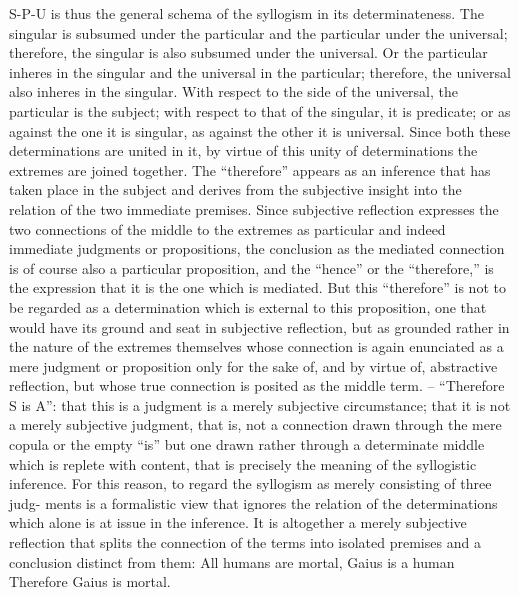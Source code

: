 S-P-U is thus the general schema of the syllogism in its determinateness.
The singular is subsumed under the particular and the particular under the
universal; therefore, the singular is also subsumed under the universal. Or
the particular inheres in the singular and the universal in the particular;
therefore, the universal also inheres in the singular. With respect to the side
of the universal, the particular is the subject; with respect to that of the
singular, it is predicate; or as against the one it is singular, as against the
other it is universal. Since both these determinations are united in it, by
virtue of this unity of determinations the extremes are joined together. The
“therefore” appears as an inference that has taken place in the subject and
derives from the subjective insight into the relation of the two immediate
premises. Since subjective reflection expresses the two connections of the
middle to the extremes as particular and indeed immediate judgments or
propositions, the conclusion as the mediated connection is of course also a
particular proposition, and the “hence” or the “therefore,” is the expression
that it is the one which is mediated. But this “therefore” is not to be
regarded as a determination which is external to this proposition, one that
would have its ground and seat in subjective reflection, but as grounded
rather in the nature of the extremes themselves whose connection is again
enunciated as a mere judgment or proposition only for the sake of, and by
virtue of, abstractive reflection, but whose true connection is posited as the
middle term. – “Therefore S is A”: that this is a judgment is a merely
subjective circumstance; that it is not a merely subjective judgment, that is,
not a connection drawn through the mere copula or the empty “is” but one
drawn rather through a determinate middle which is replete with content,
that is precisely the meaning of the syllogistic inference.
For this reason, to regard the syllogism as merely consisting of three judg-
ments is a formalistic view that ignores the relation of the determinations
which alone is at issue in the inference. It is altogether a merely subjective
reflection that splits the connection of the terms into isolated premises and
a conclusion distinct from them:
All humans are mortal,
Gaius is a human
Therefore Gaius is mortal.

